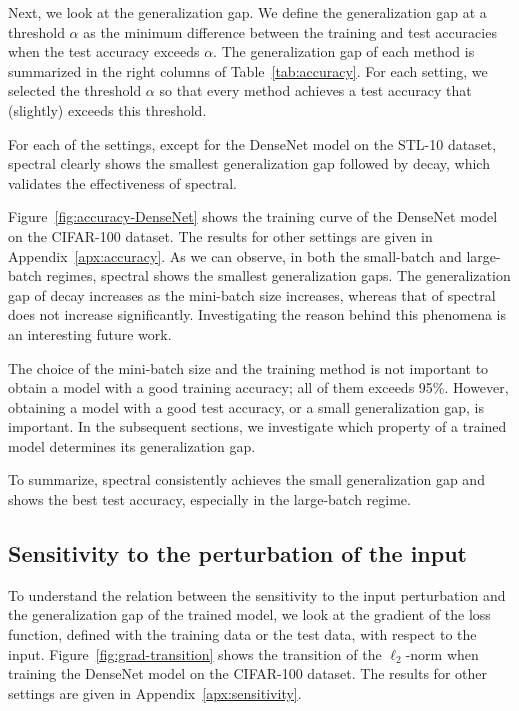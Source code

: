 Next, we look at the generalization gap. We define the generalization gap at a threshold $\alpha$ as the minimum difference between the training and test accuracies when the test accuracy exceeds $\alpha$.
The generalization gap of each method is summarized in the right columns of Table~\ref{tab:accuracy}.
For each setting, we selected the threshold $\alpha$ so that every method achieves a test accuracy that (slightly) exceeds this threshold.

For each of the settings, except for the DenseNet model on the STL-10 dataset, \textsf{spectral} clearly shows the smallest generalization gap followed by \textsf{decay}, which validates the effectiveness of \textsf{spectral}.

Figure~\ref{fig:accuracy-DenseNet} shows the training curve of the DenseNet model on the CIFAR-100 dataset. The results for other settings are given in Appendix~\ref{apx:accuracy}.
As we can observe, in both the small-batch and large-batch regimes, \textsf{spectral} shows the smallest generalization gaps. The generalization gap of \textsf{decay} increases as the mini-batch size increases, whereas that of \textsf{spectral} does not increase significantly. Investigating the reason behind this phenomena is an interesting future work.

The choice of the mini-batch size and the training method is not important to obtain a model with a good training accuracy; all of them exceeds 95\%.
However, obtaining a model with a good test accuracy, or a small generalization gap, is important. In the subsequent sections, we investigate which property of a trained model determines its generalization gap.

To summarize, \textsf{spectral} consistently achieves the small generalization gap and shows the best test accuracy, especially in the large-batch regime.

\subsection{Sensitivity to the perturbation of the input}

To understand the relation between the sensitivity to the input perturbation and the generalization gap of the trained model, we look at the gradient of the loss function, defined with the training data or the test data, with respect to the input.
Figure~\ref{fig:grad-transition} shows the transition of the $\ell_2$-norm when training the DenseNet model on the CIFAR-100 dataset. The results for other settings are given in Appendix~\ref{apx:sensitivity}.

